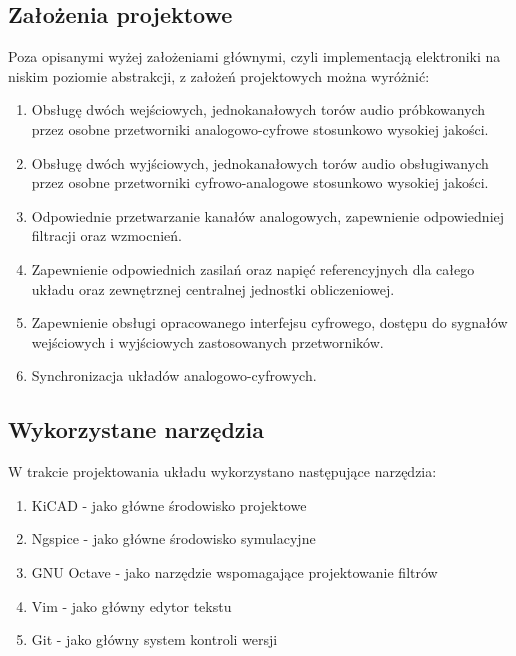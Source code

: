 \documentclass{scrartcl}
\begin{document}
\subsection{Założenia projektowe}
Poza opisanymi wyżej założeniami głównymi, czyli implementacją elektroniki na niskim poziomie abstrakcji, z założeń projektowych można wyróżnić:
\begin{enumerate}
    \item Obsługę dwóch wejściowych, jednokanałowych torów audio próbkowanych przez osobne przetworniki analogowo-cyfrowe stosunkowo wysokiej jakości.
    \item Obsługę dwóch wyjściowych, jednokanałowych torów audio obsługiwanych przez osobne przetworniki cyfrowo-analogowe stosunkowo wysokiej jakości.
    \item Odpowiednie przetwarzanie kanałów analogowych, zapewnienie odpowiedniej filtracji oraz wzmocnień.
    \item Zapewnienie odpowiednich zasilań oraz napięć referencyjnych dla całego układu oraz zewnętrznej centralnej jednostki obliczeniowej.
    \item Zapewnienie obsługi opracowanego interfejsu cyfrowego, dostępu do sygnałów wejściowych i wyjściowych zastosowanych przetworników.
    \item Synchronizacja układów analogowo-cyfrowych.
\end{enumerate}
\subsection{Wykorzystane narzędzia}
W trakcie projektowania układu wykorzystano następujące narzędzia:
\begin{enumerate}
    \item KiCAD - jako główne środowisko projektowe
    \item Ngspice - jako główne środowisko symulacyjne
    \item GNU Octave - jako narzędzie wspomagające projektowanie filtrów
    \item Vim - jako główny edytor tekstu
    \item Git - jako główny system kontroli wersji
\end{enumerate}
\end{document}
